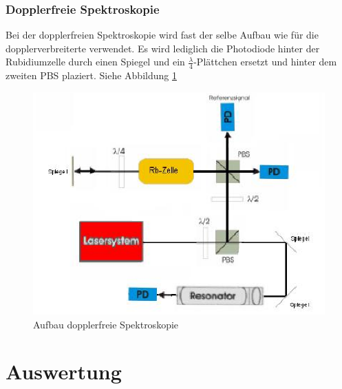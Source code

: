 \documentclass[12pt]{article}
\begin{document}
\subsubsection{Dopplerfreie Spektroskopie}
Bei der dopplerfreien Spektroskopie wird fast der selbe Aufbau wie für die dopplerverbreiterte verwendet. Es wird lediglich die Photodiode hinter der Rubidiumzelle durch einen Spiegel und ein $\frac{\lambda}{4}$-Plättchen ersetzt und hinter dem zweiten PBS plaziert. Siehe Abbildung \ref{skizze-dopplerfrei}
\begin{figure}[H]
 \includegraphics[width=0.9\linewidth]{pictures/aufbau_dopplerfrei.eps}
 \caption{Aufbau dopplerfreie Spektroskopie}
 \label{skizze-dopplerfrei}
\end{figure}


\section{Auswertung}
\end{document}
